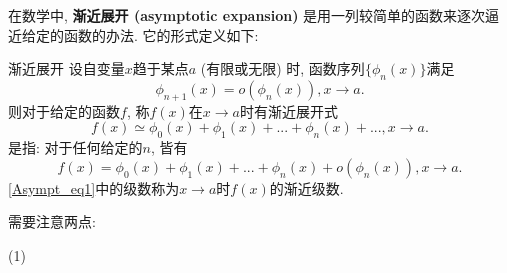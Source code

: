 
在数学中, \textbf{渐近展开 (asymptotic expansion)} 是用一列较简单的函数来逐次逼近给定的函数的办法. 它的形式定义如下:

\begin{definition}{渐近展开}
设自变量$x$趋于某点$a$ (有限或无限) 时, 函数序列$\{\phi_{n}(x)\}$满足
$$
\phi_{n+1}(x)=o(\phi_n(x)),x\to a.
$$
则对于给定的函数$f$, 称$f(x)$在$x\to a$时有渐近展开式
\begin{equation}\label{Asympt_eq1}
f(x)\simeq\phi_0(x)+\phi_1(x)+...+\phi_n(x)+...,x\to a.
\end{equation}
是指: 对于任何给定的$n$, 皆有
$$
f(x)=\phi_0(x)+\phi_1(x)+...+\phi_n(x)+o(\phi_n(x)),x\to a.
$$
\autoref{Asympt_eq1}中的级数称为$x\to a$时$f(x)$的渐近级数.
\end{definition}

需要注意两点:

(1) 